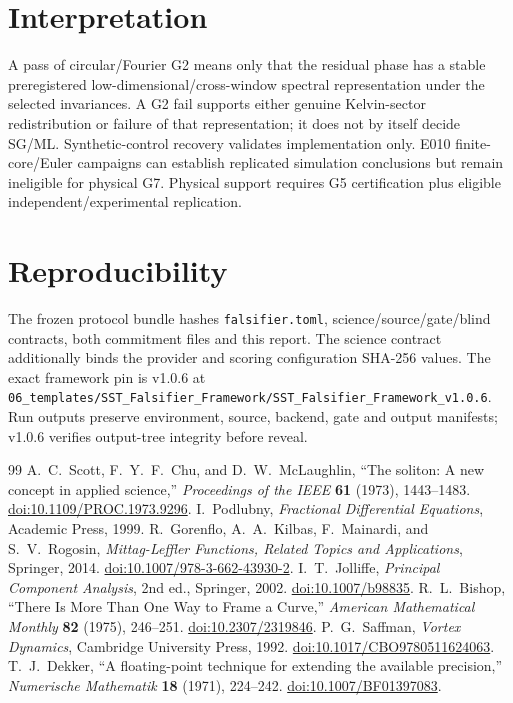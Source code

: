 \documentclass[11pt,a4paper]{article}
\newcommand{\code}[1]{\texttt{#1}}
\begin{document}
\section{Interpretation}
A pass of circular/Fourier G2 means only that the residual phase has a stable preregistered low-dimensional/cross-window spectral representation under the selected invariances. A G2 fail supports either genuine Kelvin-sector redistribution or failure of that representation; it does not by itself decide SG/ML. Synthetic-control recovery validates implementation only. E010 finite-core/Euler campaigns can establish replicated simulation conclusions but remain ineligible for physical G7. Physical support requires G5 certification plus eligible independent/experimental replication.

\section{Reproducibility}
The frozen protocol bundle hashes \code{falsifier.toml}, science/source/gate/blind contracts, both commitment files and this report. The science contract additionally binds the provider and scoring configuration SHA-256 values. The exact framework pin is v1.0.6 at \code{06\_templates/SST\_Falsifier\_Framework/SST\_Falsifier\_Framework\_v1.0.6}. Run outputs preserve environment, source, backend, gate and output manifests; v1.0.6 verifies output-tree integrity before reveal.

\begin{thebibliography}{99}
 A.~C.~Scott, F.~Y.~F.~Chu, and D.~W.~McLaughlin, ``The soliton: A new concept in applied science,'' \emph{Proceedings of the IEEE} \textbf{61} (1973), 1443--1483. \href{https://doi.org/10.1109/PROC.1973.9296}{doi:10.1109/PROC.1973.9296}.
 I.~Podlubny, \emph{Fractional Differential Equations}, Academic Press, 1999.
 R.~Gorenflo, A.~A.~Kilbas, F.~Mainardi, and S.~V.~Rogosin, \emph{Mittag-Leffler Functions, Related Topics and Applications}, Springer, 2014. \href{https://doi.org/10.1007/978-3-662-43930-2}{doi:10.1007/978-3-662-43930-2}.
 I.~T.~Jolliffe, \emph{Principal Component Analysis}, 2nd ed., Springer, 2002. \href{https://doi.org/10.1007/b98835}{doi:10.1007/b98835}.
 R.~L.~Bishop, ``There Is More Than One Way to Frame a Curve,'' \emph{American Mathematical Monthly} \textbf{82} (1975), 246--251. \href{https://doi.org/10.2307/2319846}{doi:10.2307/2319846}.
 P.~G.~Saffman, \emph{Vortex Dynamics}, Cambridge University Press, 1992. \href{https://doi.org/10.1017/CBO9780511624063}{doi:10.1017/CBO9780511624063}.
 T.~J.~Dekker, ``A floating-point technique for extending the available precision,'' \emph{Numerische Mathematik} \textbf{18} (1971), 224--242. \href{https://doi.org/10.1007/BF01397083}{doi:10.1007/BF01397083}.
\end{thebibliography}
\end{document}
